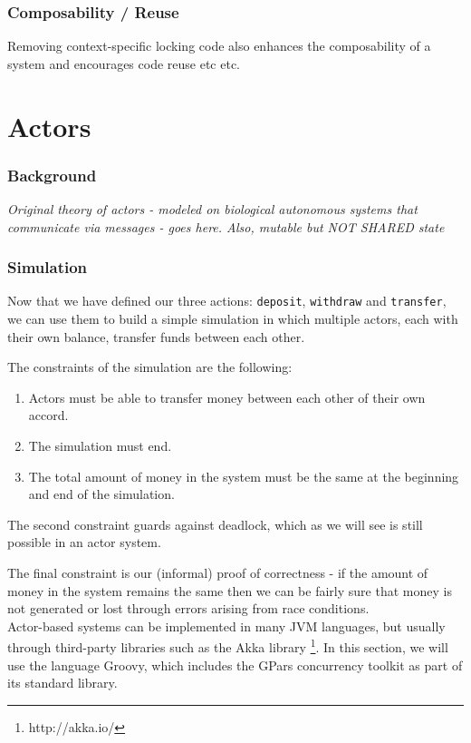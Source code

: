 \documentclass[a4paper,12pt]{kth-mag}
\begin{document}
\section{Composability / Reuse}

Removing context-specific locking code also enhances the composability of a system and encourages code reuse etc etc.

\part{ Actors}

\section{Background}

\textit{Original theory of actors - modeled on biological autonomous systems that communicate via messages - goes here. Also, mutable but NOT SHARED state}

\section{Simulation}

Now that we have defined our three actions: \texttt{deposit}, \texttt{withdraw} and \texttt{transfer}, we can use them to build a simple simulation in which multiple actors, each with their own balance, transfer funds between each other. 

The constraints of the simulation are the following:

\begin{enumerate}
\item Actors must be able to transfer money between each other of their own accord.
\item The simulation must end.
\item The total amount of money in the system must be the same at the beginning and end of the simulation.
\end{enumerate}

The second constraint guards against deadlock, which as we will see is still possible in an actor system.

The final constraint is our (informal) proof of correctness - if the amount of money in the system remains the same then we can be fairly sure that money is not generated or lost through errors arising from race conditions. \\

Actor-based systems can be implemented in many JVM languages, but usually through third-party libraries such as the Akka library \footnote{http://akka.io/}. In this section, we will use the language Groovy, which includes the GPars concurrency toolkit as part of its standard library.
\end{document}
